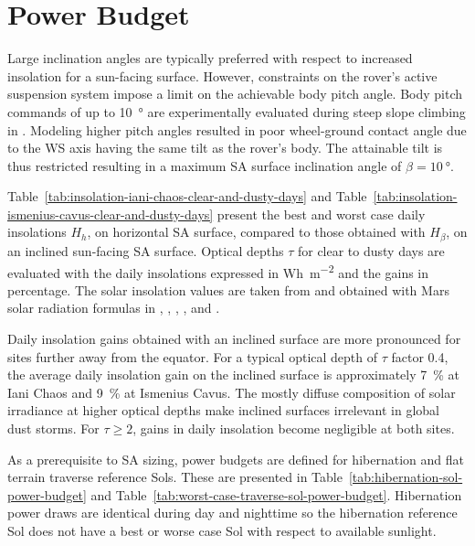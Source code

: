 \documentclass[twocolumn,letterpaper]{IEEEAerospaceCLS}  %
\newcommand{\refTab}[1]{{Table}~\ref{#1}}  %
\begin{document}
\section{Power Budget}

Large inclination angles are typically preferred with respect to increased insolation for a sun-facing surface. However, constraints on the rover's active suspension system impose a limit on the achievable body pitch angle. Body pitch commands of up to \SI{10}{\degree} are experimentally evaluated during steep slope climbing in \cite{Cordes2018a}. Modeling higher pitch angles resulted in poor wheel-ground contact angle due to the \ac{WS} axis having the same tilt as the rover's body. The attainable tilt is thus restricted resulting in a maximum \ac{SA} surface inclination angle of $\beta = \SI{10}{\degree}$.



\refTab{tab:insolation-iani-chaos-clear-and-dusty-days} and \refTab{tab:insolation-ismenius-cavus-clear-and-dusty-days} present the best and worst case daily insolations $H_{h}$, on horizontal \ac{SA} surface, compared to those obtained with $H_{\beta}$, on an inclined sun-facing \ac{SA} surface. Optical depths $\tau$ for clear to dusty days are evaluated with the daily insolations expressed in \si{Wh.m^{-2}} and the gains in percentage. The solar insolation values are taken from \cite{Labreche2020} and obtained with Mars solar radiation formulas in \cite{Appelbaum1989}, \cite{Appelbaum1990}, \cite{Appelbaum1991}, \cite{Appelbaum1993}, and \cite{Appelbaum1994}.



Daily insolation gains obtained with an inclined surface are more pronounced for sites further away from the equator. For a typical optical depth of $\tau$ factor 0.4, the average daily insolation gain on the inclined surface is approximately \SI{7}{\percent} at Iani Chaos and \SI{9}{\percent} at Ismenius Cavus.
The mostly diffuse composition of solar irradiance at higher optical depths make inclined surfaces irrelevant in global dust storms. For $\tau \geq 2$, gains in daily insolation become negligible at both sites.



As a prerequisite to \ac{SA} sizing, power budgets are defined for hibernation and flat terrain traverse reference Sols. These are presented in \refTab{tab:hibernation-sol-power-budget} and \refTab{tab:worst-case-traverse-sol-power-budget}. Hibernation power draws are identical during day and nighttime so the hibernation reference Sol does not have a best or worse case Sol with respect to available sunlight.
\end{document}
